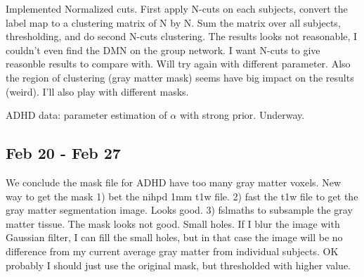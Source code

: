 \documentclass{article}
\begin{document}
Implemented Normalized cuts. First apply N-cuts on each subjects, convert the label map to a clustering matrix of N by N. Sum the matrix over all subjects, thresholding, and do second N-cuts clustering. The results looks not reasonable, I couldn't even find the DMN on the group network. I want N-cuts to give reasonble results to compare with. Will try again with different parameter. Also the region of clustering (gray matter mask) seems have big impact on the results (weird). I'll also play with different masks. 

ADHD data: parameter estimation of $\alpha$ with strong prior. Underway.

\subsection{Feb 20 - Feb 27}
We conclude the mask file for ADHD have too many gray matter voxels. New way to get the mask 1) bet the nihpd 1mm t1w file. 2) fast the t1w file to get the gray matter segmentation image. Looks good. 3) fslmaths to subsample the gray matter tissue. The mask looks not good. Small holes. If I blur the image with Gaussian filter, I can fill the small holes, but in that case the image will be no difference from my current average gray matter from individual subjects. OK probably I should just use the original mask, but thresholded with higher value.

    



\end{document}
